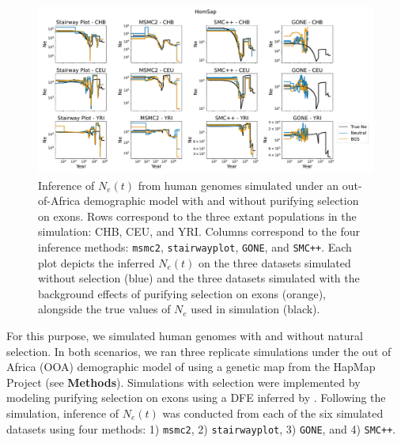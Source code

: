 \documentclass[hidelinks]{article}
\newcommand{\msmc}{\texttt{msmc2}\xspace}
\newcommand{\stairway}{\texttt{stairwayplot}\xspace}
\newcommand{\gone}{\texttt{GONE}\xspace}
\newcommand{\smcpp}{\texttt{SMC++}\xspace}
\begin{document}
    
    \begin{figure}[b!]
        \centering
        \includegraphics[width=\textwidth]{figures/HomSap/OOA/estimated_Ne_t_final}
        \caption{
        \label{fig:human-demography}
        Inference of $N_e(t)$ from human genomes simulated under an out-of-Africa demographic model \citep{ragsdale2019models}
        with and without purifying selection on exons. 
        Rows correspond to the three extant populations in the simulation: CHB, CEU, and YRI.
        Columns correspond to the four inference methods:    
        \msmc \citep{Schiffels2020}, \stairway \citep{liu2020stairway}, \gone \citep{santiago2020recent}, and \smcpp \citep{terhorst2017robust}.
        Each plot depicts the inferred $N_e(t)$ on the three datasets simulated without selection (blue)
        and the three datasets simulated with the background effects of purifying selection on exons (orange),
        alongside the true values of $N_e$ used in simulation (black).
        }
    \end{figure}

    For this purpose, we simulated human genomes with and without natural selection.
    In both scenarios, we ran three replicate simulations
    under the out of Africa (OOA) demographic model of
    \citep{ragsdale2019models} using a genetic map from the HapMap Project \citep{international2007second} (see \textbf{Methods}).
    Simulations with selection were implemented by modeling purifying selection on exons
    using a DFE inferred by \cite{kim2017inference}.
    Following the simulation, inference of $N_e(t)$ was conducted from each of the six simulated datasets using four methods: 1) \msmc \citep{Schiffels2020}, 
    2) \stairway \citep{liu2020stairway}, 3) \gone \citep{santiago2020recent}, and 4) \smcpp \citep{terhorst2017robust}.
\end{document}
